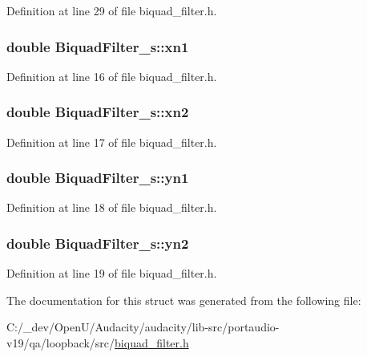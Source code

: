 Definition at line 29 of file biquad\+\_\+filter.\+h.

\subsubsection[{\texorpdfstring{xn1}{xn1}}]{\setlength{\rightskip}{0pt plus 5cm}double Biquad\+Filter\+\_\+s\+::xn1}\hypertarget{struct_biquad_filter__s_ac8a503a85b25dd64762f4044f1256c53}{}\label{struct_biquad_filter__s_ac8a503a85b25dd64762f4044f1256c53}


Definition at line 16 of file biquad\+\_\+filter.\+h.

\subsubsection[{\texorpdfstring{xn2}{xn2}}]{\setlength{\rightskip}{0pt plus 5cm}double Biquad\+Filter\+\_\+s\+::xn2}\hypertarget{struct_biquad_filter__s_a98b148686768e9db5e1c97e421091446}{}\label{struct_biquad_filter__s_a98b148686768e9db5e1c97e421091446}


Definition at line 17 of file biquad\+\_\+filter.\+h.

\subsubsection[{\texorpdfstring{yn1}{yn1}}]{\setlength{\rightskip}{0pt plus 5cm}double Biquad\+Filter\+\_\+s\+::yn1}\hypertarget{struct_biquad_filter__s_a2b5af3ba87cf790499e42f714b935d44}{}\label{struct_biquad_filter__s_a2b5af3ba87cf790499e42f714b935d44}


Definition at line 18 of file biquad\+\_\+filter.\+h.

\subsubsection[{\texorpdfstring{yn2}{yn2}}]{\setlength{\rightskip}{0pt plus 5cm}double Biquad\+Filter\+\_\+s\+::yn2}\hypertarget{struct_biquad_filter__s_a0c37c0366f8e73009c6b9522f657acda}{}\label{struct_biquad_filter__s_a0c37c0366f8e73009c6b9522f657acda}


Definition at line 19 of file biquad\+\_\+filter.\+h.



The documentation for this struct was generated from the following file\+:\begin{DoxyCompactItemize}
\item 
C\+:/\+\_\+dev/\+Open\+U/\+Audacity/audacity/lib-\/src/portaudio-\/v19/qa/loopback/src/\hyperlink{biquad__filter_8h}{biquad\+\_\+filter.\+h}\end{DoxyCompactItemize}
